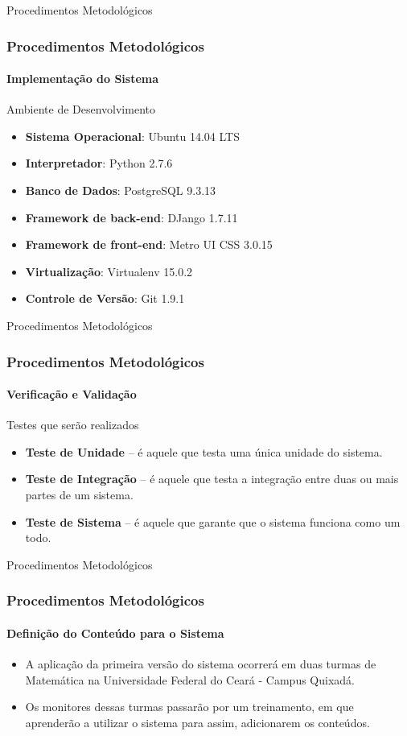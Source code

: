 \documentclass[aspectratio=169]{beamer}
\begin{document}
\begin{frame}{Procedimentos Metodológicos}
\frametitle{Procedimentos Metodológicos}
\framesubtitle{Implementação do Sistema}

\begin{block}{Ambiente de Desenvolvimento}
	 \begin{itemize}
	  \item \textbf{Sistema Operacional}: Ubuntu 14.04 LTS
	  \item \textbf{Interpretador}: Python 2.7.6
	  \item \textbf{Banco de Dados}: PostgreSQL 9.3.13
	  \item \textbf{Framework de back-end}: DJango 1.7.11
	  \item \textbf{Framework de front-end}: Metro UI CSS 3.0.15
	  \item \textbf{Virtualiza\c{c}\~ao}: Virtualenv 15.0.2
	  \item \textbf{Controle de Vers\~ao}: Git 1.9.1
	 \end{itemize}

\end{block}


\end{frame}


\begin{frame}{Procedimentos Metodológicos}
\frametitle{Procedimentos Metodológicos}
\framesubtitle{Verificação e Validação}

\begin{block}{Testes que ser\~ao realizados}
	\begin{itemize}
	 \item \textbf{Teste de Unidade} – é aquele que testa uma única unidade do sistema.
	 \item \textbf{Teste de Integração} – é aquele que testa a integração entre duas ou mais partes de um sistema.
	 \item \textbf{Teste de Sistema} – é aquele que garante que o sistema funciona como um todo.
	\end{itemize}

\end{block}


\end{frame}


\begin{frame}{Procedimentos Metodológicos}
\frametitle{Procedimentos Metodológicos}
\framesubtitle{Definição do Conteúdo para o Sistema}
	\begin{itemize}
	 \item A aplicação da primeira versão do sistema ocorrer\'a em duas turmas de Matemática na Universidade
Federal do Ceará - Campus Quixadá.
	\item Os monitores dessas turmas passar\~ao por um treinamento, em que aprender\~ao a utilizar o sistema para assim, adicionarem os conte\'udos.
	\end{itemize}

\end{frame}
\end{document}
